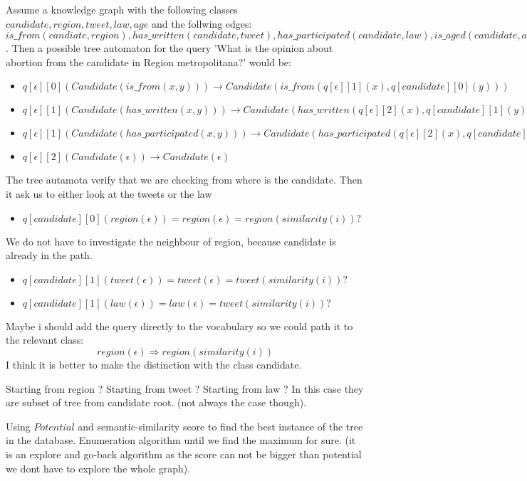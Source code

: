 \documentclass[10pt]{article}
\theoremstyle{definition}
\begin{document}
Assume a knowledge graph with the following classes $candidate, region, tweet, law, age$ and the follwing edges:
$is\_from(candiate,region), has\_written(candidate,tweet), has\_participated(candidate,law), is\_aged(candidate,age)$.
Then a possible tree automaton for the query 'What is the opinion about abortion from the candidate in Region metropolitana?' would be:
\begin{itemize}
    \item $q[\epsilon][0](Candidate(is\_from(x,y))) \rightarrow Candidate(is\_from(q[\epsilon][1](x),q[candidate][0](y)))$
    \item $q[\epsilon][1](Candidate(has\_written(x,y))) \rightarrow Candidate(has\_written(q[\epsilon][2](x),q[candidate][1](y)))$
    \item $q[\epsilon][1](Candidate(has\_participated(x,y))) \rightarrow Candidate(has\_participated(q[\epsilon][2](x),q[candidate][1](y)))$
    \item $q[\epsilon][2](Candidate(\epsilon)) \rightarrow Candidate(\epsilon)$
\end{itemize}
The tree autamota verify that we are checking from where is the candidate.
Then it ask us to either look at the tweets or the law
\begin{itemize}
    \item $q[candidate][0](region(\epsilon)) = region(\epsilon) = region(similarity(i))?$
\end{itemize}
We do not have to investigate the neighbour of region, because candidate is already in the path.
\begin{itemize}
    \item $q[candidate][1](tweet(\epsilon)) = tweet(\epsilon)= tweet(similarity(i))?$
\end{itemize}
\begin{itemize}
    \item $q[candidate][1](law(\epsilon)) = law(\epsilon)= tweet(similarity(i))?$
\end{itemize}

Maybe i should add the query directly to the vocabulary so we could path it to the relevant class:
$$region(\epsilon) \Rightarrow region(similarity(i))$$ I think it is better to make the distinction with the class candidate. 


Starting from region ? 
Starting from tweet ? 
Starting from law ? 
In this case they are subset of tree from candidate root. (not always the case though).


Using $Potential$ and semantic-similarity score to find the best instance of the tree in the database.
Enumeration algorithm until we find the maximum for sure. (it is an explore and go-back algorithm as the score can not be bigger than potential we dont have to explore the whole graph).
\end{document}

